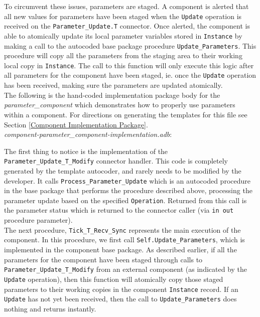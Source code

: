 To circumvent these issues, parameters are staged. A component is alerted that all new values for parameters have been staged when the \texttt{Update} operation is received on the \texttt{Parameter\_Update.T} connector. Once alerted, the component is able to atomically update its local parameter variables stored in \texttt{Instance} by making a call to the autocoded base package procedure \texttt{Update\_Parameters}. This procedure will copy all the parameters from the staging area to their working local copy in \texttt{Instance}. The call to this function will only execute this logic after all parameters for the component have been staged, ie. once the \texttt{Update} operation has been received, making sure the parameters are updated atomically. \\

The following is the hand-coded implementation package body for the \textit{parameter\_component} which demonstrates how to properly use parameters within a component. For directions on generating the templates for this file see Section \ref{Component Implementation Package}. \\

\textit{component-parameter\_component-implementation.adb}:

The first thing to notice is the implementation of the \texttt{Parameter\_Update\_T\_Modify} connector handler. This code is completely generated by the template autocoder, and rarely needs to be modified by the developer. It calls \texttt{Process\_Parameter\_Update} which is an autocoded procedure in the base package that performs the procedure described above, processing the parameter update based on the specified \texttt{Operation}. Returned from this call is the parameter status which is returned to the connector caller (via \texttt{in out} procedure parameter). \\

The next procedure, \texttt{Tick\_T\_Recv\_Sync} represents the main execution of the component. In this procedure, we first call \texttt{Self.Update\_Parameters}, which is implemented in the component base package. As described earlier, if all the parameters for the component have been staged through calls to \texttt{Parameter\_Update\_T\_Modify} from an external component (as indicated by the \texttt{Update} operation), then this function will atomically copy those staged parameters to their working copies in the component \texttt{Instance} record. If an \texttt{Update} has not yet been received, then the call to \texttt{Update\_Parameters} does nothing and returns instantly. \\

